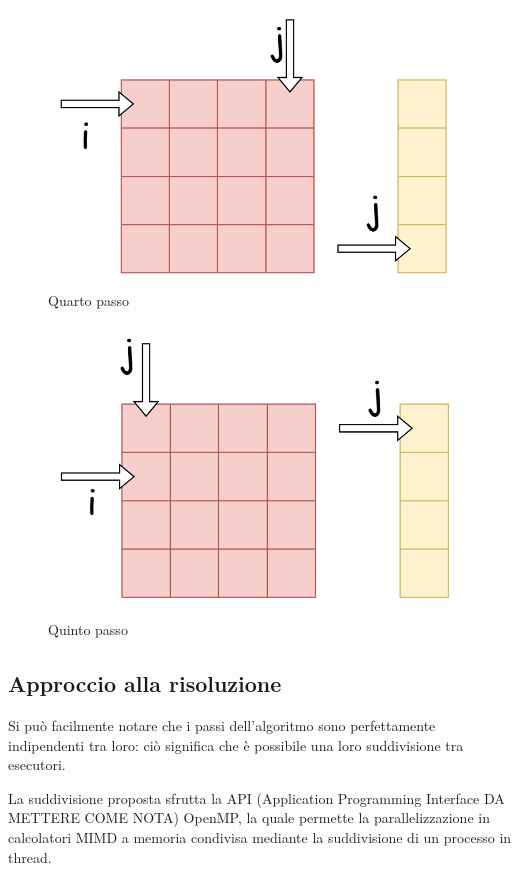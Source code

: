 \begin{figure}[h]
    \centering
    \includegraphics[width=0.4\linewidth]{QuartaItr.png}
    \caption{Quarto passo}
    \label{fig:enter-label}    
\end{figure}
\begin{figure}[h]
    \centering
    \includegraphics[width=0.4\linewidth]{QuintaItr.png}
    \caption{Quinto passo}
    \label{fig:enter-label}    
\end{figure}


\subsection{Approccio alla risoluzione}
Si può facilmente notare che i passi dell'algoritmo sono perfettamente indipendenti tra loro: ciò significa che è possibile una loro suddivisione tra esecutori.

La suddivisione proposta sfrutta la API (Application Programming Interface DA METTERE COME NOTA) OpenMP, la quale permette la parallelizzazione in calcolatori MIMD a memoria condivisa mediante la suddivisione di un processo in thread.
